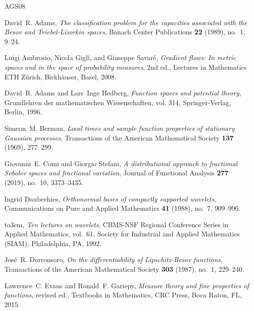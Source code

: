 \documentclass[11pt,reqno]{amsart}
\theoremstyle{definition}
\numberwithin{equation}{section}
\begin{document}
\providecommand{\bysame}{\leavevmode\hbox to3em{\hrulefill}\thinspace}
\providecommand{\MR}{\relax\ifhmode\unskip\space\fi MR }
\providecommand{\MRhref}[2]{%
  \href{http://www.ams.org/mathscinet-getitem?mr=#1}{#2}
}
\providecommand{\href}[2]{#2}
\begin{thebibliography}{AGS08}

David~R. Adams, \emph{The classification problem for the capacities associated
  with the {B}esov and {T}riebel-{L}izorkin spaces}, Banach Center Publications
  \textbf{22} (1989), no.~1, 9--24.

Luigi Ambrosio, Nicola Gigli, and Giuseppe Savar{\'e}, \emph{Gradient flows: In
  metric spaces and in the space of probability measures}, 2nd ed., Lectures in
  Mathematics ETH Z{\"u}rich, Birkh{\"a}user, Basel, 2008.

David~R. Adams and Lars~Inge Hedberg, \emph{Function spaces and potential
  theory}, Grundlehren der mathematischen Wissenschaften, vol. 314,
  Springer-Verlag, Berlin, 1996.

Simeon~M. Berman, \emph{Local times and sample function properties of
  stationary {G}aussian processes}, Transactions of the American Mathematical
  Society \textbf{137} (1969), 277--299.

Giovanni~E. Comi and Giorgio Stefani, \emph{A distributional approach to
  fractional {S}obolev spaces and fractional variation}, Journal of Functional
  Analysis \textbf{277} (2019), no.~10, 3373--3435.

Ingrid Daubechies, \emph{Orthonormal bases of compactly supported wavelets},
  Communications on Pure and Applied Mathematics \textbf{41} (1988), no.~7,
  909--996.

\bysame, \emph{Ten lectures on wavelets}, CBMS-NSF Regional Conference Series
  in Applied Mathematics, vol.~61, Society for Industrial and Applied
  Mathematics (SIAM), Philadelphia, PA, 1992.

Jos\'{e}~R. Dorronsoro, \emph{On the differentiability of {L}ipschitz-{B}esov
  functions}, Transactions of the American Mathematical Society \textbf{303}
  (1987), no.~1, 229--240.

Lawrence~C. Evans and Ronald~F. Gariepy, \emph{Measure theory and fine
  properties of functions}, revised ed., Textbooks in Mathematics, CRC Press,
  Boca Raton, FL, 2015.


\end{thebibliography}
\end{document}
